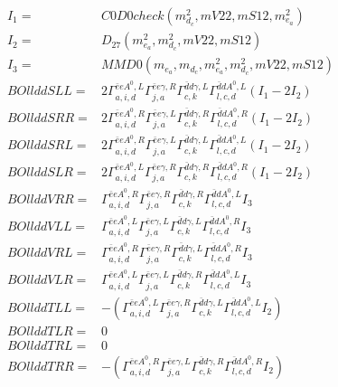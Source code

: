 \documentclass[A4,landscape]{article}
\begin{document}
\begin{align} 
I_1 = & C0D0check(m^2_{d_{{c}}}, mV22, mS12, m^2_{e_{{a}}}) \\ 
I_2 = & D_{27}(m^2_{e_{{a}}}, m^2_{d_{{c}}}, mV22, mS12) \\ 
I_3 = & MMD0(m_{e_{{a}}}, m_{d_{{c}}}, m^2_{e_{{a}}}, m^2_{d_{{c}}}, mV22, mS12) \\ 
  BOllddSLL= & 2  \Gamma^{\bar{e}e A^0 ,L}_{a, i, d} \Gamma^{\bar{e}e \gamma ,R}_{j, a} \Gamma^{\bar{d}d \gamma ,L}_{c, k} \Gamma^{\bar{d}d A^0 ,L}_{l, c, d} (I_1 - 2 I_2) \\ 
  BOllddSRR= & 2  \Gamma^{\bar{e}e A^0 ,R}_{a, i, d} \Gamma^{\bar{e}e \gamma ,L}_{j, a} \Gamma^{\bar{d}d \gamma ,R}_{c, k} \Gamma^{\bar{d}d A^0 ,R}_{l, c, d} (I_1 - 2 I_2) \\ 
  BOllddSRL= & 2  \Gamma^{\bar{e}e A^0 ,R}_{a, i, d} \Gamma^{\bar{e}e \gamma ,L}_{j, a} \Gamma^{\bar{d}d \gamma ,L}_{c, k} \Gamma^{\bar{d}d A^0 ,L}_{l, c, d} (I_1 - 2 I_2) \\ 
  BOllddSLR= & 2  \Gamma^{\bar{e}e A^0 ,L}_{a, i, d} \Gamma^{\bar{e}e \gamma ,R}_{j, a} \Gamma^{\bar{d}d \gamma ,R}_{c, k} \Gamma^{\bar{d}d A^0 ,R}_{l, c, d} (I_1 - 2 I_2) \\ 
  BOllddVRR= &  \Gamma^{\bar{e}e A^0 ,R}_{a, i, d} \Gamma^{\bar{e}e \gamma ,R}_{j, a} \Gamma^{\bar{d}d \gamma ,R}_{c, k} \Gamma^{\bar{d}d A^0 ,L}_{l, c, d} I_3 \\ 
  BOllddVLL= &  \Gamma^{\bar{e}e A^0 ,L}_{a, i, d} \Gamma^{\bar{e}e \gamma ,L}_{j, a} \Gamma^{\bar{d}d \gamma ,L}_{c, k} \Gamma^{\bar{d}d A^0 ,R}_{l, c, d} I_3 \\ 
  BOllddVRL= &  \Gamma^{\bar{e}e A^0 ,R}_{a, i, d} \Gamma^{\bar{e}e \gamma ,R}_{j, a} \Gamma^{\bar{d}d \gamma ,L}_{c, k} \Gamma^{\bar{d}d A^0 ,R}_{l, c, d} I_3 \\ 
  BOllddVLR= &  \Gamma^{\bar{e}e A^0 ,L}_{a, i, d} \Gamma^{\bar{e}e \gamma ,L}_{j, a} \Gamma^{\bar{d}d \gamma ,R}_{c, k} \Gamma^{\bar{d}d A^0 ,L}_{l, c, d} I_3 \\ 
  BOllddTLL= & -( \Gamma^{\bar{e}e A^0 ,L}_{a, i, d} \Gamma^{\bar{e}e \gamma ,R}_{j, a} \Gamma^{\bar{d}d \gamma ,L}_{c, k} \Gamma^{\bar{d}d A^0 ,L}_{l, c, d} I_2) \\ 
  BOllddTLR= & 0 \\ 
  BOllddTRL= & 0 \\ 
  BOllddTRR= & -( \Gamma^{\bar{e}e A^0 ,R}_{a, i, d} \Gamma^{\bar{e}e \gamma ,L}_{j, a} \Gamma^{\bar{d}d \gamma ,R}_{c, k} \Gamma^{\bar{d}d A^0 ,R}_{l, c, d} I_2) \\ 
\end{align} 
\end{document}

